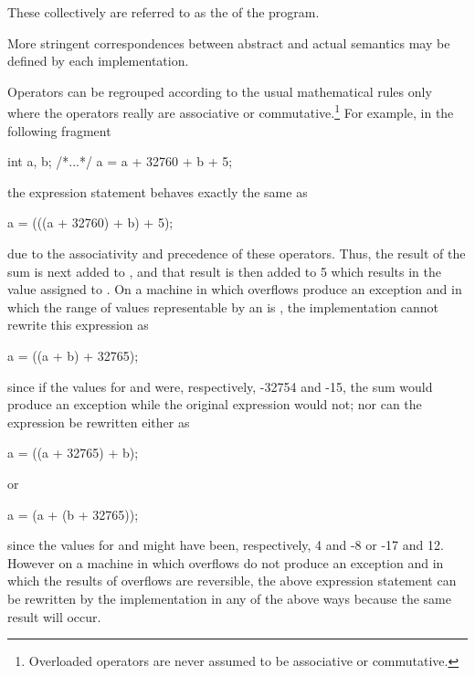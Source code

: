 These collectively are referred to as the
 of the program.
\begin{note} More stringent correspondences between abstract and actual
semantics may be defined by each implementation. \end{note}

\pnum
{}%
%
\begin{note} Operators can be regrouped according to the usual
mathematical rules only where the operators really are associative or
commutative.\footnote{Overloaded operators are never assumed to be associative or
commutative. }
For example, in the following fragment
\begin{codeblock}
int a, b;
/*...*/
a = a + 32760 + b + 5;
\end{codeblock}
the expression statement behaves exactly the same as
\begin{codeblock}
a = (((a + 32760) + b) + 5);
\end{codeblock}
due to the associativity and precedence of these operators. Thus, the
result of the sum  is next added to , and
that result is then added to 5 which results in the value assigned to
. On a machine in which overflows produce an exception and in
which the range of values representable by an  is
, the implementation cannot rewrite this
expression as
\begin{codeblock}
a = ((a + b) + 32765);
\end{codeblock}
since if the values for  and  were, respectively,
-32754 and -15, the sum  would produce an exception while
the original expression would not; nor can the expression be rewritten
either as
\begin{codeblock}
a = ((a + 32765) + b);
\end{codeblock}
or
\begin{codeblock}
a = (a + (b + 32765));
\end{codeblock}
since the values for  and  might have been,
respectively, 4 and -8 or -17 and 12. However on a machine in which
overflows do not produce an exception and in which the results of
overflows are reversible, the above expression statement can be
rewritten by the implementation in any of the above ways because the
same result will occur. \end{note}


